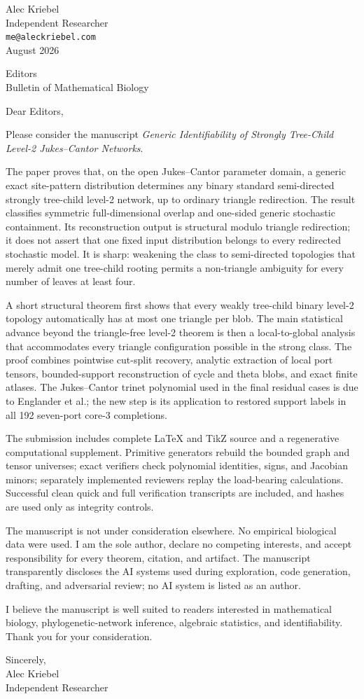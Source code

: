 \documentclass[10pt]{article}
\newcommand{\TargetJournal}{Bulletin of Mathematical Biology}
\begin{document}
\begin{flushright}
Alec Kriebel\\Independent Researcher\\\texttt{me@aleckriebel.com}\\[4pt]August 2026
\end{flushright}
Editors\\\TargetJournal

Dear Editors,

Please consider the manuscript \emph{Generic Identifiability of Strongly Tree-Child Level-2 Jukes--Cantor Networks}.

The paper proves that, on the open Jukes--Cantor parameter domain, a generic exact site-pattern distribution determines any binary standard semi-directed strongly tree-child level-2 network, up to ordinary triangle redirection.  The result classifies symmetric full-dimensional overlap and one-sided generic stochastic containment.  Its reconstruction output is structural modulo triangle redirection; it does not assert that one fixed input distribution belongs to every redirected stochastic model.  It is sharp: weakening the class to semi-directed topologies that merely admit one tree-child rooting permits a non-triangle ambiguity for every number of leaves at least four.

A short structural theorem first shows that every weakly tree-child binary level-2 topology automatically has at most one triangle per blob.  The main statistical advance beyond the triangle-free level-2 theorem is then a local-to-global analysis that accommodates every triangle configuration possible in the strong class.  The proof combines pointwise cut-split recovery, analytic extraction of local port tensors, bounded-support reconstruction of cycle and theta blobs, and exact finite atlases.  The Jukes--Cantor trinet polynomial used in the final residual cases is due to Englander et al.; the new step is its application to restored support labels in all 192 seven-port core-3 completions.

The submission includes complete LaTeX and TikZ source and a regenerative computational supplement.  Primitive generators rebuild the bounded graph and tensor universes; exact verifiers check polynomial identities, signs, and Jacobian minors; separately implemented reviewers replay the load-bearing calculations.  Successful clean quick and full verification transcripts are included, and hashes are used only as integrity controls.

The manuscript is not under consideration elsewhere.  No empirical biological data were used.  I am the sole author, declare no competing interests, and accept responsibility for every theorem, citation, and artifact.  The manuscript transparently discloses the AI systems used during exploration, code generation, drafting, and adversarial review; no AI system is listed as an author.

I believe the manuscript is well suited to readers interested in mathematical biology, phylogenetic-network inference, algebraic statistics, and identifiability.  Thank you for your consideration.

Sincerely,\\[12pt]
Alec Kriebel\\Independent Researcher
\end{document}
